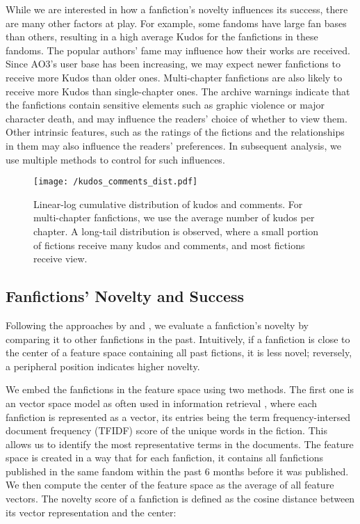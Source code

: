 \documentclass[a4paper]{article}
\begin{document}
While we are interested in how a fanfiction's novelty influences its success, there are many other factors at play. For example, some fandoms have large fan bases than others, resulting in a high average Kudos for the fanfictions in these fandoms. The popular authors' fame may influence how their works are received. Since AO3's user base has been increasing, we may expect newer fanfictions to receive more Kudos than older ones. Multi-chapter fanfictions are also likely to receive more Kudos than single-chapter ones. The archive warnings indicate that the fanfictions contain sensitive elements such as graphic violence or major character death, and may influence the readers' choice of whether to view them.   Other intrinsic features, such as the ratings of the fictions and the relationships in them may also influence the readers' preferences. In subsequent analysis, we use multiple methods to control for such influences.

\begin{figure}
    \centering
        \texttt{[image: /kudos\_comments\_dist.pdf]}
        \caption{Linear-log cumulative distribution of kudos and comments. For multi-chapter fanfictions, we use the average number of kudos per chapter. A long-tail distribution is observed, where a small portion of fictions receive many kudos and comments, and most fictions receive view.}
        \label{fig:kudos_dist}
\end{figure}


\subsection*{Fanfictions' Novelty and Success}
Following the approaches by \cite{askin2017makes} and \cite{de2015game}, we evaluate a fanfiction's novelty by comparing it to other fanfictions in the past. Intuitively, if a fanfiction is close to the center of a feature space containing all past fictions, it is less novel; reversely, a peripheral position indicates higher novelty. 

We embed the fanfictions in the feature space using two methods. The first one is an vector space model as often used in information retrieval \cite{turney2010frequency}, where each fanfiction is represented as a vector, its entries being the term frequency-intersed document frequency (TFIDF) score of the unique words in the fiction. This allows us to identify the most representative terms in the documents. The feature space is created in a way that for each fanfiction, it contains all fanfictions published in the same fandom within the past 6 months before it was published. We then compute the center of the feature space as the average of all feature vectors. The novelty score of a fanfiction is defined as the cosine distance between its vector representation and the center:
\end{document}
